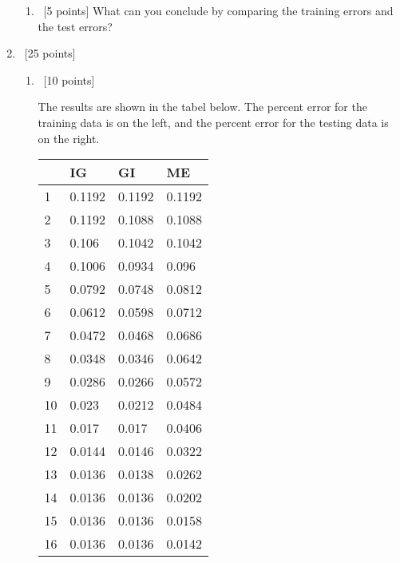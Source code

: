 \documentclass[12pt, fullpage,letterpaper]{article}
\begin{document}
\begin{enumerate}
\begin{enumerate}
\item~[5 points] What can you conclude by comparing the training errors and the test errors? 
\end{enumerate}


\item~[25 points] 
\begin{enumerate}
	\item~[10 points]
	
	The results are shown in the tabel below. The percent error for the training data is on the left, and the percent error for the testing data is on the right.

	\begin{tabular}{|l|l|l|l|}
		\hline
		   & IG & GI & ME\\ \hline
		1  & 0.1192           & 0.1192     & 0.1192         \\ \hline
		2  & 0.1192           & 0.1088     & 0.1088         \\ \hline
		3  & 0.106            & 0.1042     & 0.1042         \\ \hline
		4  & 0.1006           & 0.0934     & 0.096          \\ \hline
		5  & 0.0792           & 0.0748     & 0.0812         \\ \hline
		6  & 0.0612           & 0.0598     & 0.0712         \\ \hline
		7  & 0.0472           & 0.0468     & 0.0686         \\ \hline
		8  & 0.0348           & 0.0346     & 0.0642         \\ \hline
		9  & 0.0286           & 0.0266     & 0.0572         \\ \hline
		10 & 0.023            & 0.0212     & 0.0484         \\ \hline
		11 & 0.017            & 0.017      & 0.0406         \\ \hline
		12 & 0.0144           & 0.0146     & 0.0322         \\ \hline
		13 & 0.0136           & 0.0138     & 0.0262         \\ \hline
		14 & 0.0136           & 0.0136     & 0.0202         \\ \hline
		15 & 0.0136           & 0.0136     & 0.0158         \\ \hline
		16 & 0.0136           & 0.0136     & 0.0142         \\ \hline
		\end{tabular}                  
		\begin{tabular}{|l|l|l|l|}

\end{tabular}
\end{enumerate}
\end{enumerate}
\end{document}
